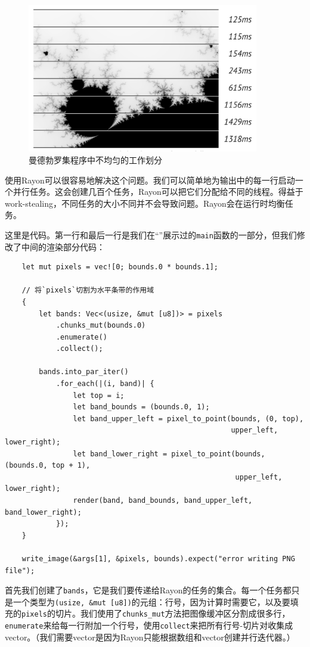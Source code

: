 \begin{figure}[htbp]
    \centering
    \includegraphics[width=0.9\textwidth]{../img/f19-4.png}
    \caption{曼德勃罗集程序中不均匀的工作划分}
    \label{f19-4}
\end{figure}

使用Rayon可以很容易地解决这个问题。我们可以简单地为输出中的每一行启动一个并行任务。这会创建几百个任务，Rayon可以把它们分配给不同的线程。得益于work-stealing，不同任务的大小不同并不会导致问题。Rayon会在运行时均衡任务。

这里是代码。第一行和最后一行是我们在“”展示过的\texttt{main}函数的一部分，但我们修改了中间的渲染部分代码：
\begin{verbatim}
    let mut pixels = vec![0; bounds.0 * bounds.1];

    // 将`pixels`切割为水平条带的作用域
    {
        let bands: Vec<(usize, &mut [u8])> = pixels
            .chunks_mut(bounds.0)
            .enumerate()
            .collect();
        
        bands.into_par_iter()
            .for_each(|(i, band)| {
                let top = i;
                let band_bounds = (bounds.0, 1);
                let band_upper_left = pixel_to_point(bounds, (0, top),
                                                     upper_left, lower_right);
                let band_lower_right = pixel_to_point(bounds, (bounds.0, top + 1),
                                                      upper_left, lower_right);
                render(band, band_bounds, band_upper_left, band_lower_right);
            });
    }

    write_image(&args[1], &pixels, bounds).expect("error writing PNG file");
\end{verbatim}

首先我们创建了\texttt{bands}，它是我们要传递给Rayon的任务的集合。每一个任务都只是一个类型为\texttt{(usize, \&mut [u8])}的元组：行号，因为计算时需要它，以及要填充的\texttt{pixels}的切片。我们使用了\texttt{chunks\_mut}方法把图像缓冲区分割成很多行，\texttt{enumerate}来给每一行附加一个行号，使用\texttt{collect}来把所有行号-切片对收集成vector。（我们需要vector是因为Rayon只能根据数组和vector创建并行迭代器。）


